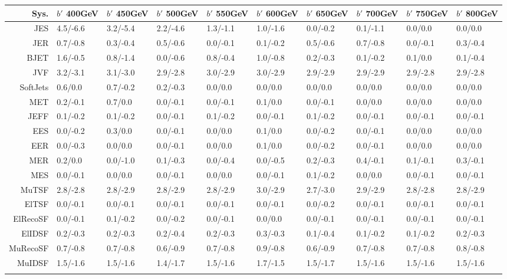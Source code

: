 \begin{tabular}{r|p{.06\linewidth}p{.06\linewidth}p{.06\linewidth}p{.06\linewidth}p{.06\linewidth}p{.06\linewidth}p{.06\linewidth}p{.06\linewidth}p{.06\linewidth}}
\toprule
 Sys.  & $b'$ 400GeV & $b'$ 450GeV & $b'$ 500GeV & $b'$ 550GeV & $b'$ 600GeV & $b'$ 650GeV & $b'$ 700GeV & $b'$ 750GeV & $b'$ 800GeV \\
\toprule
JES  & 4.5/-6.6 & 3.2/-5.4 & 2.2/-4.6 & 1.3/-1.1 & 1.0/-1.6 & 0.0/-0.2 & 0.1/-1.1 & 0.0/0.0 & 0.0/0.0 \\
JER  & 0.7/-0.8 & 0.3/-0.4 & 0.5/-0.6 & 0.0/-0.1 & 0.1/-0.2 & 0.5/-0.6 & 0.7/-0.8 & 0.0/-0.1 & 0.3/-0.4 \\
BJET  & 1.6/-0.5 & 0.8/-1.4 & 0.0/-0.6 & 0.8/-0.4 & 1.0/-0.8 & 0.2/-0.3 & 0.1/-0.2 & 0.1/0.0 & 0.1/-0.4 \\
JVF  & 3.2/-3.1 & 3.1/-3.0 & 2.9/-2.8 & 3.0/-2.9 & 3.0/-2.9 & 2.9/-2.9 & 2.9/-2.9 & 2.9/-2.8 & 2.9/-2.8 \\
SoftJets  & 0.6/0.0 & 0.7/-0.2 & 0.2/-0.3 & 0.0/0.0 & 0.0/0.0 & 0.0/0.0 & 0.0/0.0 & 0.0/0.0 & 0.0/0.0 \\
MET  & 0.2/-0.1 & 0.7/0.0 & 0.0/-0.1 & 0.0/-0.1 & 0.1/0.0 & 0.0/-0.1 & 0.0/0.0 & 0.0/0.0 & 0.0/0.0 \\
JEFF  & 0.1/-0.2 & 0.1/-0.2 & 0.0/-0.1 & 0.1/-0.2 & 0.0/-0.1 & 0.1/-0.2 & 0.0/-0.1 & 0.0/-0.1 & 0.0/-0.1 \\
EES  & 0.0/-0.2 & 0.3/0.0 & 0.0/-0.1 & 0.0/0.0 & 0.1/0.0 & 0.0/-0.2 & 0.0/-0.1 & 0.0/0.0 & 0.0/0.0 \\
EER  & 0.0/-0.3 & 0.0/0.0 & 0.0/-0.1 & 0.0/0.0 & 0.1/0.0 & 0.0/-0.2 & 0.0/-0.1 & 0.0/0.0 & 0.0/0.0 \\
MER  & 0.2/0.0 & 0.0/-1.0 & 0.1/-0.3 & 0.0/-0.4 & 0.0/-0.5 & 0.2/-0.3 & 0.4/-0.1 & 0.1/-0.1 & 0.3/-0.1 \\
MES  & 0.0/-0.1 & 0.0/0.0 & 0.0/-0.1 & 0.0/0.0 & 0.0/-0.1 & 0.1/-0.2 & 0.0/0.0 & 0.0/-0.1 & 0.0/-0.1 \\
MuTSF  & 2.8/-2.8 & 2.8/-2.9 & 2.8/-2.9 & 2.8/-2.9 & 3.0/-2.9 & 2.7/-3.0 & 2.9/-2.9 & 2.8/-2.8 & 2.8/-2.9 \\
ElTSF  & 0.0/-0.1 & 0.0/-0.1 & 0.0/-0.1 & 0.0/-0.1 & 0.0/-0.1 & 0.0/-0.2 & 0.0/-0.1 & 0.0/-0.1 & 0.0/-0.1 \\
ElRecoSF  & 0.0/-0.1 & 0.1/-0.2 & 0.0/-0.2 & 0.0/-0.1 & 0.0/0.0 & 0.0/-0.1 & 0.0/-0.1 & 0.0/-0.1 & 0.0/-0.1 \\
ElIDSF  & 0.2/-0.3 & 0.2/-0.3 & 0.2/-0.4 & 0.2/-0.3 & 0.3/-0.3 & 0.1/-0.4 & 0.1/-0.2 & 0.1/-0.2 & 0.2/-0.3 \\
MuRecoSF  & 0.7/-0.8 & 0.7/-0.8 & 0.6/-0.9 & 0.7/-0.8 & 0.9/-0.8 & 0.6/-0.9 & 0.7/-0.8 & 0.7/-0.8 & 0.8/-0.8 \\
MuIDSF  & 1.5/-1.6 & 1.5/-1.6 & 1.4/-1.7 & 1.5/-1.6 & 1.7/-1.5 & 1.5/-1.7 & 1.5/-1.6 & 1.5/-1.6 & 1.5/-1.6 \\
 \\
\bottomrule
\end{tabular}
